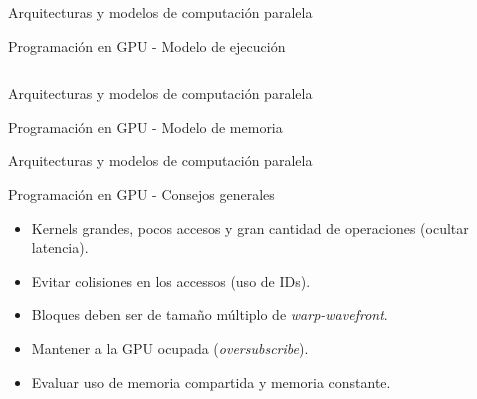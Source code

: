 \begin{frame}{Arquitecturas y modelos de computación paralela}
\begin{block}{Programación en GPU - Modelo de ejecución}
\begin{columns}

  \begin{column}{.50\textwidth}
	\centerline{
      }
  \end{column}
  
  \begin{column}{.50\textwidth}
    \centerline{
      }
  \end{column}
  
\end{columns}
\end{block}
\end{frame}

\begin{frame}{Arquitecturas y modelos de computación paralela}
\begin{block}{Programación en GPU - Modelo de memoria}
\centerline{}
\end{block}
\end{frame}

\begin{frame}{Arquitecturas y modelos de computación paralela}
\begin{block}{Programación en GPU - Consejos generales}
\begin{itemize}
  \item Kernels grandes, pocos accesos y gran cantidad de operaciones (ocultar latencia).
  \item Evitar colisiones en los accessos (uso de IDs).
  \item Bloques deben ser de tamaño múltiplo de \textit{warp-wavefront}.
  \item Mantener a la GPU ocupada (\textit{oversubscribe}).
  \item Evaluar uso de memoria compartida y memoria constante.
\end{itemize}
\end{block}
\end{frame}

